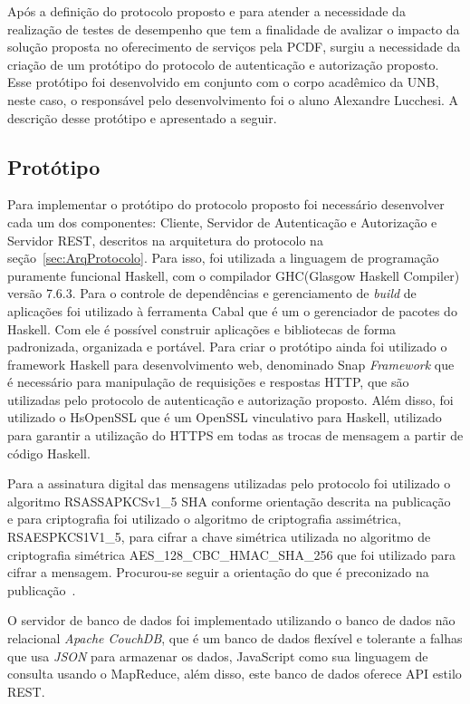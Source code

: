 Após a definição do protocolo proposto e para atender a necessidade da realização de testes de desempenho que tem a finalidade de avalizar o impacto da solução proposta no oferecimento de serviços pela PCDF, surgiu a necessidade da criação de um protótipo do protocolo de autenticação e autorização proposto. Esse protótipo foi desenvolvido em conjunto com o corpo acadêmico da UNB, neste caso, o responsável pelo desenvolvimento foi o aluno Alexandre Lucchesi.  A descrição desse protótipo e apresentado a seguir.
\subsection{Protótipo}

Para implementar o protótipo do protocolo proposto foi necessário desenvolver cada um dos componentes: Cliente, Servidor de Autenticação e Autorização e Servidor REST, descritos na arquitetura do protocolo na seção~\ref{sec:ArqProtocolo}. Para isso, foi utilizada a linguagem de programação puramente funcional Haskell, com o compilador GHC(Glasgow Haskell Compiler) versão 7.6.3. Para o controle de dependências e gerenciamento de \emph{build} de aplicações foi utilizado à ferramenta Cabal que é um o gerenciador de pacotes do Haskell. Com ele é possível construir aplicações e bibliotecas de forma padronizada, organizada e portável. Para criar o protótipo ainda foi utilizado o framework Haskell para desenvolvimento web, denominado Snap \emph{Framework} que é necessário para manipulação de requisições e respostas HTTP, que são utilizadas pelo protocolo de autenticação e autorização proposto. Além disso, foi utilizado o HsOpenSSL que é um OpenSSL vinculativo para Haskell, utilizado para garantir a utilização do HTTPS em todas as trocas de mensagem a partir de código Haskell.

Para a assinatura digital das mensagens utilizadas pelo protocolo foi utilizado o algoritmo RSASSA\-PKCS\-v1\_5 SHA conforme orientação descrita na publicação~\cite{ietfjws} e para criptografia foi utilizado o algoritmo de criptografia assimétrica, RSAES\-PKCS1\-V1\_5, para cifrar a chave simétrica utilizada no algoritmo de criptografia simétrica AES\_128\_CBC\_HMAC\_SHA\_256 que foi utilizado para cifrar a mensagem. Procurou-se seguir a orientação do que é preconizado na publicação~\cite{jwt2014}.

O servidor de banco de dados foi implementado utilizando o banco de dados não relacional \emph{Apache CouchDB}, que é um banco de dados flexível e tolerante a falhas que usa \emph{JSON} para armazenar os dados, JavaScript como sua linguagem de consulta usando o MapReduce, além disso, este banco de dados oferece API estilo REST.

